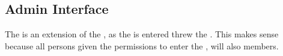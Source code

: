 \subsection{Admin Interface}
\label{sec:admininterface}

The \ainterface[] is an extension of the \sinterface[], as the \ainterface[] is entered threw the \sinterface[]. This makes sense because all persons given the permissions to enter the \ainterface[], will also \astaff[] members.